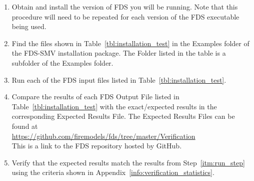 \documentclass[11pt]{book}
\begin{document}
\begin{enumerate}
\item Obtain and install the version of FDS you will be running.  Note that this procedure will need to be repeated for each version of the FDS executable being used.
\item Find the files shown in Table~\ref{tbl:installation_test} in the {\ct Examples} folder of the FDS-SMV installation package.  The Folder listed in the table is a subfolder of the {\ct Examples} folder.
\item Run each of the FDS input files listed in Table~\ref{tbl:installation_test}. \label{itm:run_step}
\item Compare the results of each FDS Output File listed in Table~\ref{tbl:installation_test} with the exact/expected results in the corresponding Expected Results File. The Expected Results Files can be found at \\ \href{https://github.com/firemodels/fds/tree/master/Verification}{https://github.com/firemodels/fds/tree/master/Verification} \\
    This is a link to the FDS repository hosted by GitHub.
\item Verify that the expected results match the results from Step~\ref{itm:run_step} using the criteria shown in Appendix~\ref{info:verification_statistics}.
\end{enumerate}
\end{document}
